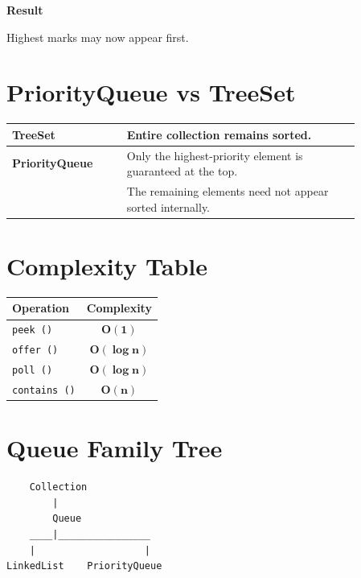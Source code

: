 \documentclass[11pt,a4paper]{book}
\begin{document}
\medskip

\textcolor{RosettaDeepGreen}{\textbf{Result}}

Highest marks may now appear first.
\section{PriorityQueue vs TreeSet}

\begin{center}
\renewcommand{\arraystretch}{1.5}
\begin{tabular}{|p{0.28\linewidth}|p{0.58\linewidth}|}
\hline

\textbf{\textcolor{RosettaBlue}{TreeSet}}
&
Entire collection remains sorted.
\\
\hline

\textbf{\textcolor{RosettaJade}{PriorityQueue}}
&
Only the highest-priority element is guaranteed at the top.
\\

&
The remaining elements need not appear sorted internally.
\\
\hline

\end{tabular}
\end{center}
\section{Complexity Table}

\begin{center}
\renewcommand{\arraystretch}{1.4}
\begin{tabular}{|l|c|}
\hline
\textbf{Operation} & \textbf{Complexity} \\
\hline
\texttt{peek ()}     & $\mathbf{O(1)}$ \\
\hline
\texttt{offer ()}   & $\mathbf{O(\log n)}$ \\
\hline
\texttt{poll ()}   & $\mathbf{O(\log n)}$ \\
\hline
\texttt{contains ()} & $\mathbf{O(n)}$ \\
\hline
\end{tabular}
\end{center}
\section{Queue Family Tree}

\begin{center}
\setlength{\fboxsep}{8pt}
\begin{lrbox}{\myDiagramBox}
\begin{minipage}{0.45\textwidth}
\begin{Verbatim}
    Collection
        |
        Queue
    ____|________________
    |                   |
LinkedList    PriorityQueue
\end{Verbatim}
\end{minipage}
\end{lrbox}
\end{center}
\end{document}

